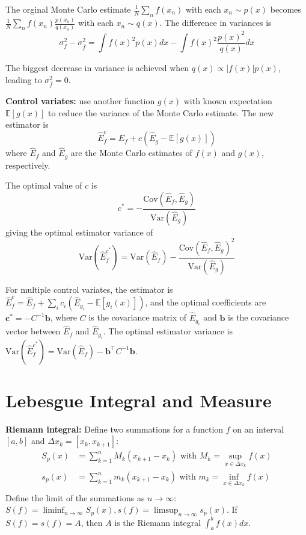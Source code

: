 \documentclass[12pt]{article}
\begin{document}
The orginal Monte Carlo estimate $\frac{1}{N} \sum_n f(x_n)$ with each $x_n \sim p(x)$ becomes $\frac{1}{N} \sum_n f(x_n) \frac{p(x_n)}{q(x_n)}$ with each $x_n \sim q(x)$. The difference in variances is
$$
\sigma_f^2 - \sigma_{\bar{f}}^2 = \int f(x)^2 p(x) dx - \int f(x)^2 \frac{p(x)^2}{q(x)} dx
$$

The biggest decrease in variance is achieved when $q(x) \propto |f(x)| p(x)$, leading to $\sigma_{\bar{f}}^2 = 0$.

\textbf{Control variates:} use another function $g(x)$ with known expectation $\mathbb{E}[g(x)]$ to reduce the variance of the Monte Carlo estimate. The new estimator is
$$
\hat{E}_f^c = \hat{E}_f + c (\hat{E}_g - \mathbb{E}[g(x)])
$$
where $\hat{E}_f$ and $\hat{E}_g$ are the Monte Carlo estimates of $f(x)$ and $g(x)$, respectively.

The optimal value of $c$ is
$$
c^* = -\frac{\text{Cov}(\hat{E}_f, \hat{E}_g)}{\text{Var}(\hat{E}_g)}
$$
giving the optimal estimator variance of
$$
\text{Var}(\hat{E}_f^{c^*}) = \text{Var}(\hat{E}_f) - \frac{\text{Cov}(\hat{E}_f, \hat{E}_g)^2}{\text{Var}(\hat{E}_g)}
$$

For multiple control variates, the estimator is $\hat{E}_f^c = \hat{E}_f + \sum_i c_i (\hat{E}_{g_i} - \mathbb{E}[g_i(x)])$, and the optimal coefficients are $\mathbf{c}^* = -C^{-1} \mathbf{b}$, where $C$ is the covariance matrix of $\hat{E}_{g_i}$ and $\mathbf{b}$ is the covariance vector between $\hat{E}_f$ and $\hat{E}_{g_i}$.
The optimal estimator variance is $\text{Var}(\hat{E}_f^{c^*}) = \text{Var}(\hat{E}_f) - \mathbf{b}^\top C^{-1} \mathbf{b}$.

\section{Lebesgue Integral and Measure}
\textbf{Riemann integral:} Define two summations for a function $f$ on an interval $[a, b]$ and $\Delta x_k = [x_k, x_{k+1}]$:
\begin{align*}
    S_p(x) &= \sum_{k=1}^n M_k (x_{k+1} - x_k) \text{ with } M_k = \sup_{x \in \Delta x_k} f(x) \\
    s_p(x) &= \sum_{k=1}^n m_k (x_{k+1} - x_k) \text{ with } m_k = \inf_{x \in \Delta x_k} f(x) \\
\end{align*}
Define the limit of the summations as $n \to \infty$: $S(f) = \liminf_{n \to \infty} S_p(x), s(f) = \limsup_{n \to \infty} s_p(x)$.
If $S(f) = s(f) = A$, then $A$ is the Riemann integral $\int_a^b f(x) dx$.
\end{document}
